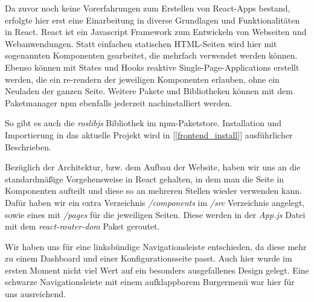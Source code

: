 \begin{flushleft}

Da zuvor noch keine Vorerfahrungen zum Erstellen von React-Apps bestand, erfolgte hier erst eine Einarbeitung in diverse Grundlagen und Funktionalitäten in  React.
React ist ein Javascript Framework zum Entwickeln von Webseiten und Webanwendungen.
Statt einfachen statischen HTML-Seiten wird hier mit sogenannten Komponenten gearbeitet, die mehrfach verwendet werden können.
Ebenso können mit States und Hooks reaktive Single-Page-Applications erstellt werden, die ein re-rendern der jeweiligen Komponenten erlauben, ohne ein Neuladen der ganzen Seite.
Weitere Pakete und Bibliotheken können mit dem Paketmanager npm ebenfalls jederzeit nachinstalliert werden.

So gibt es auch die \textit{roslibjs} Bibliothek im npm-Paketstore.
Installation und Importierung in das aktuelle Projekt wird in [\ref{frontend_install}] ausführlicher Beschrieben.



Bezüglich der Architektur, bzw. dem Aufbau der Website, haben wir uns an die standardmäßige Vorgehensweise in React gehalten, in dem man die Seite in Komponenten aufteilt und diese so an mehreren Stellen wieder verwenden kann. Dafür haben wir ein extra Verzeichnis \textit{/components} im \textit{/src} Verzeichnis angelegt, sowie eines mit \textit{/pages} für die jeweiligen Seiten. Diese werden in der \textit{App.js} Datei mit dem \textit{react-router-dom} Paket geroutet.


Wir haben uns für eine linksbündige Navigationsleiste entschieden, da diese mehr zu einem Dashboard und einer Konfigurationsseite passt. Auch hier wurde im ersten Moment nicht viel Wert auf ein besonders ausgefallenes Design gelegt. Eine schwarze Navigationsleiste mit einem aufklappbarem Burgermenü war hier für uns ausreichend. 


\end{flushleft}

